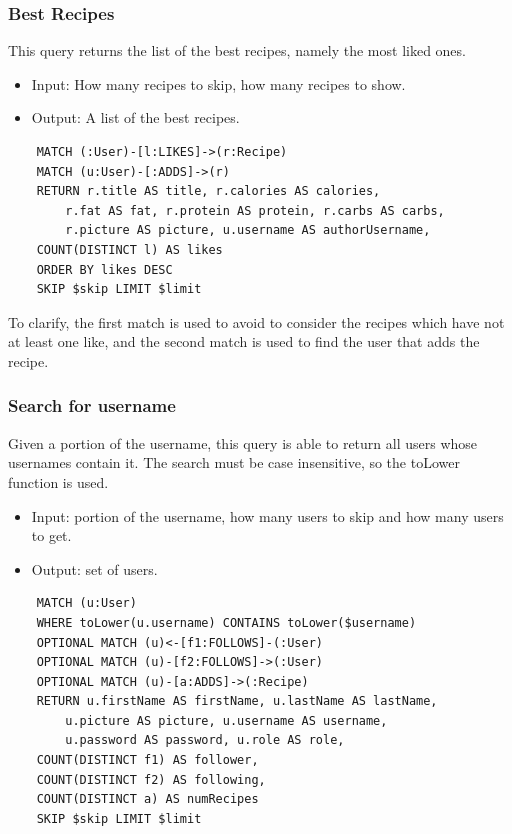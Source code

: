 \documentclass[a4paper]{report}
\begin{document}
\subsubsection{Best Recipes}
This query returns the list of the best recipes, namely the most liked ones.
\begin{itemize}
	\item Input: How many recipes to skip, how many recipes to show.
	\item Output: A list of the best recipes.
\end{itemize}
\lstset{ language=java}
\begin{lstlisting}
	MATCH (:User)-[l:LIKES]->(r:Recipe)
	MATCH (u:User)-[:ADDS]->(r)
	RETURN r.title AS title, r.calories AS calories,
		r.fat AS fat, r.protein AS protein, r.carbs AS carbs, 
		r.picture AS picture, u.username AS authorUsername,
	COUNT(DISTINCT l) AS likes 
	ORDER BY likes DESC
	SKIP $skip LIMIT $limit
\end{lstlisting}
To clarify, the first match is used to avoid to consider the recipes which have not at least one like, and the second match is used to find the user that adds the recipe.
\subsubsection{Search for username}
Given a portion of the username, this query is able to return all users whose usernames contain it. The search must be case insensitive, so the toLower function is used. 
\begin{itemize}
\item Input: portion of the username, how many users to skip and how many users to get.
\item Output: set of users.	
\end{itemize}
\lstset{ language=java}
\begin{lstlisting}
	MATCH (u:User)
	WHERE toLower(u.username) CONTAINS toLower($username)
	OPTIONAL MATCH (u)<-[f1:FOLLOWS]-(:User)
	OPTIONAL MATCH (u)-[f2:FOLLOWS]->(:User)
	OPTIONAL MATCH (u)-[a:ADDS]->(:Recipe)
	RETURN u.firstName AS firstName, u.lastName AS lastName, 
		u.picture AS picture, u.username AS username, 
		u.password AS password, u.role AS role, 
	COUNT(DISTINCT f1) AS follower,
	COUNT(DISTINCT f2) AS following, 
	COUNT(DISTINCT a) AS numRecipes
	SKIP $skip LIMIT $limit
\end{lstlisting} 
\end{document}
